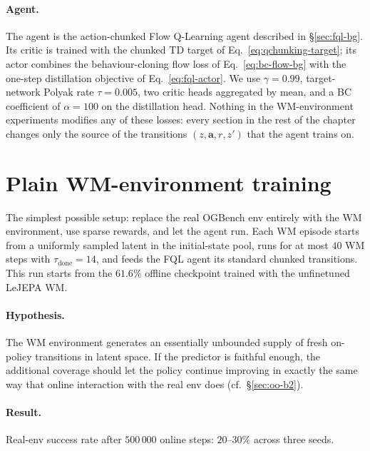 \paragraph{Agent.} The agent is the action-chunked Flow Q-Learning agent described in \S\ref{sec:fql-bg}. Its critic is trained with the chunked TD target of Eq.~\eqref{eq:qchunking-target}; its actor combines the behaviour-cloning flow loss of Eq.~\eqref{eq:bc-flow-bg} with the one-step distillation objective of Eq.~\eqref{eq:fql-actor}. We use $\gamma = 0.99$, target-network Polyak rate $\tau = 0.005$, two critic heads aggregated by mean, and a BC coefficient of $\alpha = 100$ on the distillation head. Nothing in the WM-environment experiments modifies any of these losses: every section in the rest of the chapter changes only the source of the transitions $(z, \mathbf{a}, r, z')$ that the agent trains on.

\section{Plain WM-environment training}
\label{sec:oo-exp1}

The simplest possible setup: replace the real OGBench env entirely with the WM environment, use sparse rewards, and let the agent run. Each WM episode starts from a uniformly sampled latent in the initial-state pool, runs for at most $40$ WM steps with $\tau_{\text{done}}=14$, and feeds the FQL agent its standard chunked transitions. This run starts from the $61.6\%$ offline checkpoint trained with the unfinetuned LeJEPA WM.

\paragraph{Hypothesis.} The WM environment generates an essentially unbounded supply of fresh on-policy transitions in latent space. If the predictor is faithful enough, the additional coverage should let the policy continue improving in exactly the same way that online interaction with the real env does (cf.\ \S\ref{sec:oo-b2}).

\paragraph{Result.} Real-env success rate after $500\,000$ online steps: $20$--$30\%$ across three seeds.

